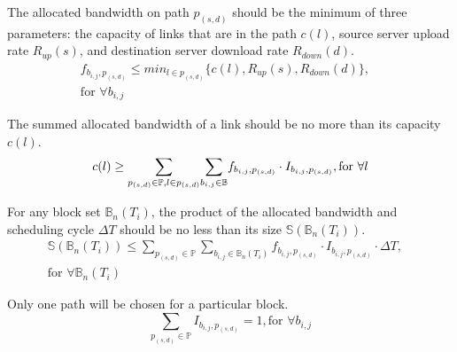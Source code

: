 \begin{packeditemize}

\item The allocated bandwidth on path $p_{(s,d)}$ should be the minimum of three parameters: the capacity of links that are in the path $c(l)$, source server upload rate $R_{up}(s)$, and destination server download rate $R_{down}(d)$.
\begin{equation}
\begin{split}
f_{b_{i,j},p_{(s,d)}} \leq  \displaystyle{min_{l\in p_{(s,d)}}} \{c(l),R_{up}(s),R_{down}(d)\},& \\
\text{for }\forall b_{i,j}&
\end{split}
\end{equation}


\item The summed allocated bandwidth of a link should be no more than its capacity $c(l)$.
\begin{equation}
c(l) \geq  \displaystyle{\sum_{p_{(s,d)}\in \mathbb{P},l\in p_{(s,d)}}} \displaystyle{\sum_{b_{i,j} \in \mathbb{B}}} f_{b_{i,j},p_{(s,d)}} \cdot I_{b_{i,j},p_{(s,d)}}, \text{for }\forall l\\
\end{equation}

\item For any block set $\mathbb{B}_n(T_i)$, the product of the allocated bandwidth and scheduling cycle $\Delta T$ should be no less than its size $\mathbb{S}(\mathbb{B}_n(T_i))$.
\begin{equation}
\begin{split}
\mathbb{S}(\mathbb{B}_n(T_i)) \leq \displaystyle{\sum_{p_{(s,d)}\in \mathbb{P}}} \displaystyle{\sum_{b_{i,j} \in \mathbb{B}_n(T_i)}} f_{b_{i,j},p_{(s,d)}} \cdot I_{b_{i,j},p_{(s,d)}} \cdot \Delta T,& \\
\text{for }\forall \mathbb{B}_n(T_i) &
\end{split}
\end{equation}


\item Only one path will be chosen for a particular block.
\begin{equation}
\displaystyle{\sum_{p_{(s,d)} \in \mathbb{P}}} I_{b_{i,j},p_{(s,d)}} = 1, \text{for }\forall b_{i,j}
\end{equation}
\end{packeditemize}


